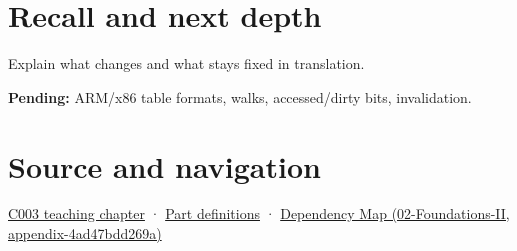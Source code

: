 \section{Recall and next depth}\label{appendix-01e5905165c4-recall-and-next-depth}

Explain what changes and what stays fixed in translation.

\textbf{Pending:} ARM/x86 table formats, walks, accessed/dirty bits, invalidation.

\section{Source and navigation}\label{appendix-01e5905165c4-source-and-navigation}

\href{Continuous\%20Notes/Computing\%20Foundations\%20-\%20From\%20Bits\%20to\%20C++\%20and\%20Systems\%20APIs\#Where\%20the\%20bytes\%20live}{C003 teaching chapter} · \hyperref[appendix-fd090d982a15-m003---parts-41-60]{Part definitions} · \href{../02-Foundations-II/main.pdf\#nameddest=appendix-4ad47bdd269a}{Dependency Map (02-Foundations-II, appendix-4ad47bdd269a)}
